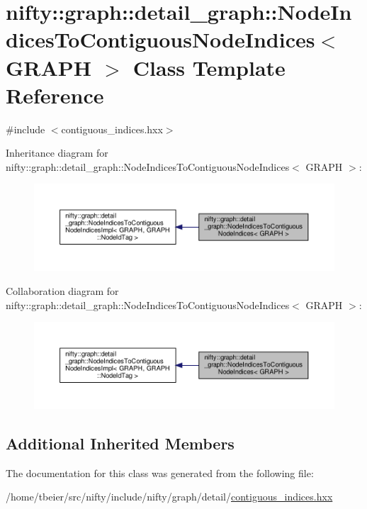 \hypertarget{classnifty_1_1graph_1_1detail__graph_1_1NodeIndicesToContiguousNodeIndices}{}\section{nifty\+:\+:graph\+:\+:detail\+\_\+graph\+:\+:Node\+Indices\+To\+Contiguous\+Node\+Indices$<$ G\+R\+A\+PH $>$ Class Template Reference}
\label{classnifty_1_1graph_1_1detail__graph_1_1NodeIndicesToContiguousNodeIndices}


{\ttfamily \#include $<$contiguous\+\_\+indices.\+hxx$>$}



Inheritance diagram for nifty\+:\+:graph\+:\+:detail\+\_\+graph\+:\+:Node\+Indices\+To\+Contiguous\+Node\+Indices$<$ G\+R\+A\+PH $>$\+:
\nopagebreak
\begin{figure}[H]
\begin{center}
\leavevmode
\includegraphics[width=350pt]{classnifty_1_1graph_1_1detail__graph_1_1NodeIndicesToContiguousNodeIndices__inherit__graph}
\end{center}
\end{figure}


Collaboration diagram for nifty\+:\+:graph\+:\+:detail\+\_\+graph\+:\+:Node\+Indices\+To\+Contiguous\+Node\+Indices$<$ G\+R\+A\+PH $>$\+:
\nopagebreak
\begin{figure}[H]
\begin{center}
\leavevmode
\includegraphics[width=350pt]{classnifty_1_1graph_1_1detail__graph_1_1NodeIndicesToContiguousNodeIndices__coll__graph}
\end{center}
\end{figure}
\subsection*{Additional Inherited Members}


The documentation for this class was generated from the following file\+:\begin{DoxyCompactItemize}
\item 
/home/tbeier/src/nifty/include/nifty/graph/detail/\hyperlink{contiguous__indices_8hxx}{contiguous\+\_\+indices.\+hxx}\end{DoxyCompactItemize}
